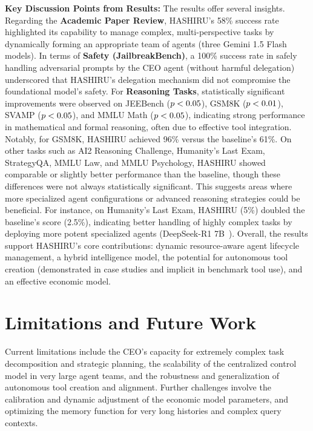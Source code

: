 \documentclass[twocolumn]{article}
\newcommand{\lt}{\ensuremath <} %
\begin{document}
\textbf{Key Discussion Points from Results:}
The results offer several insights. Regarding the \textbf{Academic Paper Review}, HASHIRU's 58\% success rate highlighted its capability to manage complex, multi-perspective tasks by dynamically forming an appropriate team of agents (three Gemini 1.5 Flash~\cite{gemini15flash} models). In terms of \textbf{Safety (JailbreakBench)}, a 100\% success rate in safely handling adversarial prompts by the CEO agent (without harmful delegation) underscored that HASHIRU's delegation mechanism did not compromise the foundational model's safety.
For \textbf{Reasoning Tasks}, statistically significant improvements were observed on JEEBench ($p \lt 0.05$), GSM8K ($p \lt 0.01$), SVAMP ($p \lt 0.05$), and MMLU Math ($p \lt 0.05$), indicating strong performance in mathematical and formal reasoning, often due to effective tool integration. Notably, for GSM8K, HASHIRU achieved 96\% versus the baseline's 61\%. On other tasks such as AI2 Reasoning Challenge, Humanity's Last Exam, StrategyQA, MMLU Law, and MMLU Psychology, HASHIRU showed comparable or slightly better performance than the baseline, though these differences were not always statistically significant. This suggests areas where more specialized agent configurations or advanced reasoning strategies could be beneficial. For instance, on Humanity's Last Exam, HASHIRU (5\%) doubled the baseline's score (2.5\%), indicating better handling of highly complex tasks by deploying more potent specialized agents (DeepSeek-R1 7B~\cite{deepseekr1_report}).
Overall, the results support HASHIRU's core contributions: dynamic resource-aware agent lifecycle management, a hybrid intelligence model, the potential for autonomous tool creation (demonstrated in case studies and implicit in benchmark tool use), and an effective economic model.

\section{Limitations and Future Work}
\label{sec:tech_limitations_future_work}
Current limitations include the CEO's capacity for extremely complex task decomposition and strategic planning, the scalability of the centralized control model in very large agent teams, and the robustness and generalization of autonomous tool creation and alignment. Further challenges involve the calibration and dynamic adjustment of the economic model parameters, and optimizing the memory function for very long histories and complex query contexts.
\end{document}
